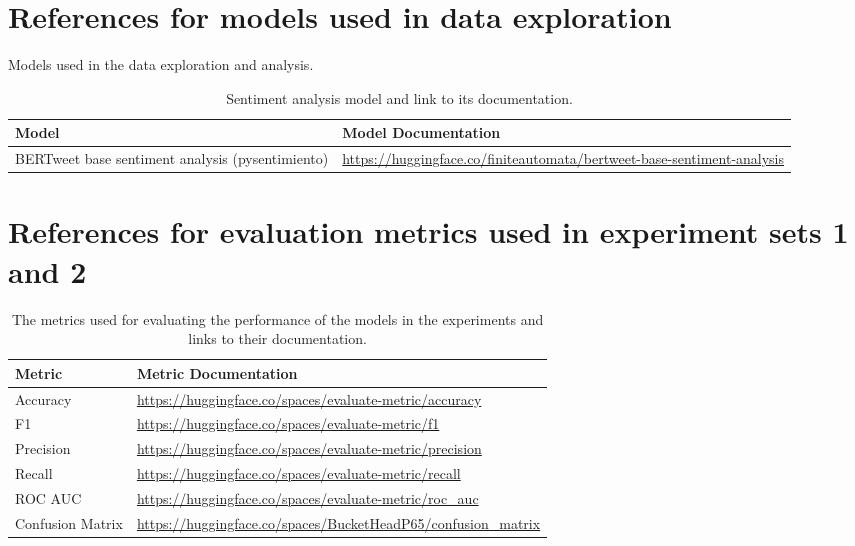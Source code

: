 \section{References for models used in data exploration}
Models used in the data exploration and analysis.
\begin{table}[ht]
    \captionsetup{font=small}
    \centering
    \begin{tabularx}{\textwidth}{|l|X|}
        \hline
        \rowcolor[gray]{0.7}
        \textbf{Model}                                   & \textbf{Model Documentation}                                                         \\
        \hline
        BERTweet base sentiment analysis (pysentimiento) & \small{\url{https://huggingface.co/finiteautomata/bertweet-base-sentiment-analysis}} \\
        \hline
    \end{tabularx}
    \caption{Sentiment analysis model and link to its documentation.}
    \label{tab: apdxb_other_model_doc}
\end{table}

\section{References for evaluation metrics used in experiment sets 1 and 2}
\begin{table}[ht]
    \captionsetup{font=small}
    \centering
    \begin{tabularx}{\textwidth}{|l|X|}
        \hline
        \rowcolor[gray]{0.7}
        \textbf{Metric}                  & \textbf{Metric Documentation}                                                    \\
        \hline

        Accuracy                         & \small{\url{https://huggingface.co/spaces/evaluate-metric/accuracy}}             \\
        \hline
        F1                               & \small{\url{https://huggingface.co/spaces/evaluate-metric/f1}}                   \\
        \hline
        Precision                        & \small{\url{https://huggingface.co/spaces/evaluate-metric/precision}}            \\
        \hline
        Recall                           & \small{\url{https://huggingface.co/spaces/evaluate-metric/recall}}               \\
        \hline
        ROC AUC                          & \small{\url{https://huggingface.co/spaces/evaluate-metric/roc_auc}}              \\
        \hline
        Confusion Matrix                 & \small{\url{https://huggingface.co/spaces/BucketHeadP65/confusion_matrix}}       \\
        \hline
    \end{tabularx}
    \caption{The metrics used for evaluating the performance of the models in the experiments and links to their documentation.}
    \label{tab: apdxb_metric_doc}
\end{table}